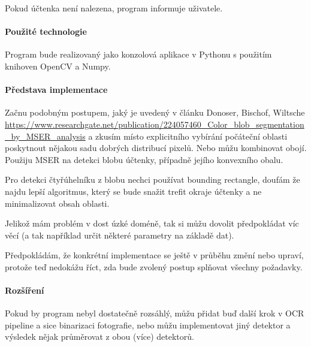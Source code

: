 \documentclass{article}
\begin{document}
Pokud účtenka není nalezena, program informuje uživatele.

\paragraph{Použité technologie\\}

Program bude realizovaný jako konzolová aplikace v Pythonu s použitím
knihoven OpenCV a Numpy.

\paragraph{Představa implementace\\}

Začnu podobným postupem, jaký je uvedený v článku Donoser, Bischof,
Wiltsche \url{https://www.researchgate.net/publication/224057460_Color_blob_segmentation_by_MSER_analysis} a zkusím místo
explicitního vybírání počáteční oblasti poskytnout nějakou sadu
dobrých distribucí pixelů. Nebo můžu kombinovat obojí. Použiju MSER na
detekci blobu účtenky, případně jejího konvexního obalu.

Pro detekci čtyřúhelníku z blobu nechci používat bounding rectangle,
doufám že najdu lepší algoritmus, který se bude snažit trefit okraje účtenky
a ne minimalizovat obsah oblasti.

Jelikož mám problém v dost úzké doméně, tak si můžu dovolit předpokládat
víc věcí (a tak například určit některé parametry na základě dat).

\qquad

Předpokládám, že konkrétní implementace se ještě v průběhu změní nebo upraví,
protože teď nedokážu říct, zda bude zvolený postup splňovat všechny požadavky.

\paragraph{Rozšíření\\}

Pokud by program nebyl dostatečně rozsáhlý, můžu přidat buď další krok
v OCR pipeline a sice binarizaci fotografie, nebo můžu implementovat
jiný detektor a výsledek nějak průměrovat z obou (více) detektorů.
\end{document}
